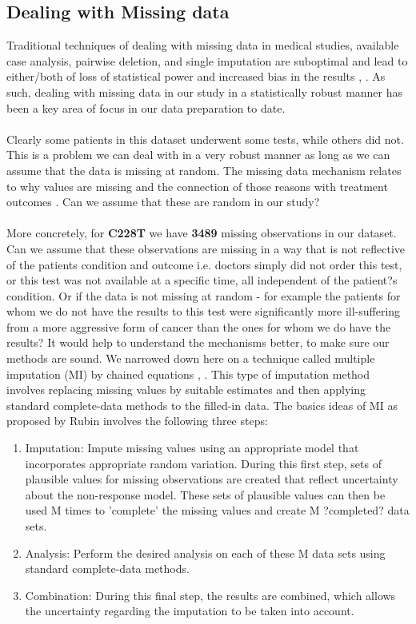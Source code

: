 \documentclass[a4paper]{article}
\begin{document}
\subsection{Dealing with Missing data}
Traditional techniques of dealing with missing data in medical studies, available case analysis, pairwise deletion, and single imputation are suboptimal and lead to either/both of loss of statistical power and increased bias in the results \cite{Bell2014}, \cite{Little2012}. As such, dealing with missing data in our study in a statistically robust manner has been a key area of focus in our data preparation to date.\\
\\
Clearly some patients in this dataset underwent some tests, while others did not. This is a problem we can deal with in a very robust manner as long as we can assume that the data is missing at random. The missing data mechanism relates to why values are missing and the connection of those reasons with treatment outcomes \cite{Garcia-Laencina2015}. Can we assume that these are random in our study? \\
\\
More concretely, for \textbf{C228T} we have \textbf{3489} missing observations in our dataset. Can we assume that these observations are missing in a way that is not reflective of the patients condition and outcome i.e. doctors simply did not order this test, or this test was not available at a specific time, all independent of the patient?s condition. Or if the data is not missing at random - for example the patients for whom we do not have the results to this test were significantly more ill-suffering from a more aggressive form of cancer than the ones for whom we do have the results? It would help to understand the mechanisms better, to make sure our methods are sound. We narrowed down here on a technique called multiple imputation (MI) by chained equations \cite{Graham2007}, \cite{Graham2009}. This type of imputation method involves replacing missing values by suitable estimates and then applying standard complete-data methods to the filled-in data. The basics ideas of MI as proposed by Rubin \cite{Rubin1996} involves the following three steps: 
\begin{enumerate}
\item Imputation: Impute missing values using an appropriate model that incorporates appropriate random variation. During this first step, sets of plausible values for missing observations are created that reflect uncertainty about the non-response model. These sets of plausible values can then be used M times to 'complete' the missing values and create M ?completed? data sets. 
\item Analysis: Perform the desired analysis on each of these M data sets using standard complete-data methods. 
\item Combination: During this final step, the results are combined, which allows the uncertainty regarding the imputation to be taken into account.
\end{enumerate}
\end{document}
